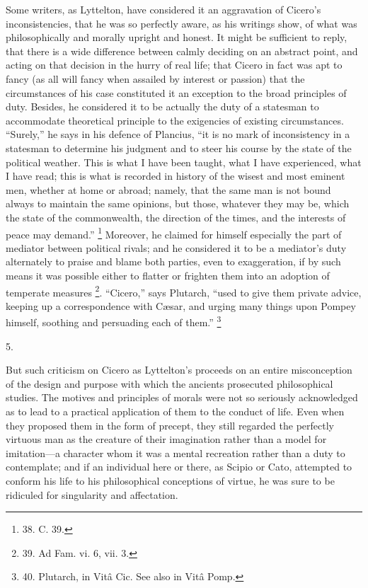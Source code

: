Some writers, as Lyttelton,
have considered it an aggravation of Cicero's inconsistencies, that he
was so perfectly aware, as his writings show, of what was
philosophically and morally upright and honest. It might be sufficient
to reply, that there is a wide difference between calmly deciding on
an abstract point, and acting on that decision in the hurry of real
life; that Cicero in fact was apt to fancy (as all will fancy when
assailed by interest or passion) that the circumstances of his case
constituted it an exception to the broad principles of duty. Besides,
he considered it to be actually the duty of a statesman to accommodate
theoretical principle to the exigencies of existing circumstances. ``Surely,''
he says in his defence of Plancius, ``it is no mark of inconsistency in
a statesman to determine his judgment and to steer his course by the
state of the political weather. This is what I have been taught, what
I have experienced, what I have read; this is what is recorded in
history of the wisest and most eminent men, whether at home or abroad;
namely, that the same man is not bound always to maintain the same
opinions, but those, whatever they may be, which the state of the
commonwealth, the direction of the times, and the interests of peace
may demand.'' \footnote{38. C. 39.} Moreover,
he claimed for himself especially the part of mediator between
political rivals; and he considered it to be a mediator's duty
alternately to praise and blame both parties, even to exaggeration, if
by such means it was possible either to flatter or frighten them into
an adoption of temperate measures \footnote{39. Ad Fam. vi. 6, vii. 3.}. ``Cicero,'' says Plutarch, ``used to give them private
advice, keeping up a correspondence with Cæsar, and urging many
things upon Pompey himself, soothing and persuading each of them.'' \footnote{40. Plutarch, in Vitâ Cic.
See also in Vitâ Pomp.}

5.

But such criticism on Cicero
as Lyttelton's proceeds on an entire misconception of the design and
purpose with which the ancients prosecuted philosophical studies. The
motives and principles of morals were not so seriously acknowledged as
to lead to a practical application of them to the conduct of life.
Even when they proposed them in the form of precept, they still
regarded the perfectly virtuous man as the creature of their
imagination rather than a model for imitation—a character whom it
was a mental recreation rather than a duty to contemplate; and if an
individual here or there, as Scipio or Cato, attempted to conform his
life to his philosophical conceptions of virtue, he was sure to be
ridiculed for singularity and affectation.


